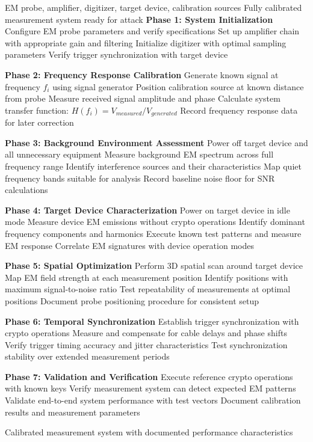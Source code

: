 \documentclass[11pt,a4paper]{article}
\theoremstyle{definition}
\begin{document}
\begin{algorithm}
\caption{Comprehensive EM Measurement Calibration}
\begin{algorithmic}[1]
\REQUIRE EM probe, amplifier, digitizer, target device, calibration sources
\ENSURE Fully calibrated measurement system ready for attack
\STATE \textbf{Phase 1: System Initialization}
\STATE Configure EM probe parameters and verify specifications
\STATE Set up amplifier chain with appropriate gain and filtering
\STATE Initialize digitizer with optimal sampling parameters
\STATE Verify trigger synchronization with target device

\STATE \textbf{Phase 2: Frequency Response Calibration}
    \STATE Generate known signal at frequency $f_i$ using signal generator
    \STATE Position calibration source at known distance from probe
    \STATE Measure received signal amplitude and phase
    \STATE Calculate system transfer function: $H(f_i) = V_{measured}/V_{generated}$
    \STATE Record frequency response data for later correction
\ENDFOR

\STATE \textbf{Phase 3: Background Environment Assessment}
\STATE Power off target device and all unnecessary equipment
\STATE Measure background EM spectrum across full frequency range
\STATE Identify interference sources and their characteristics
\STATE Map quiet frequency bands suitable for analysis
\STATE Record baseline noise floor for SNR calculations

\STATE \textbf{Phase 4: Target Device Characterization}
\STATE Power on target device in idle mode
\STATE Measure device EM emissions without crypto operations
\STATE Identify dominant frequency components and harmonics
\STATE Execute known test patterns and measure EM response
\STATE Correlate EM signatures with device operation modes

\STATE \textbf{Phase 5: Spatial Optimization}
\STATE Perform 3D spatial scan around target device
\STATE Map EM field strength at each measurement position
\STATE Identify positions with maximum signal-to-noise ratio
\STATE Test repeatability of measurements at optimal positions
\STATE Document probe positioning procedure for consistent setup

\STATE \textbf{Phase 6: Temporal Synchronization}
\STATE Establish trigger synchronization with crypto operations
\STATE Measure and compensate for cable delays and phase shifts
\STATE Verify trigger timing accuracy and jitter characteristics
\STATE Test synchronization stability over extended measurement periods

\STATE \textbf{Phase 7: Validation and Verification}
\STATE Execute reference crypto operations with known keys
\STATE Verify measurement system can detect expected EM patterns
\STATE Validate end-to-end system performance with test vectors
\STATE Document calibration results and measurement parameters

\RETURN Calibrated measurement system with documented performance characteristics
\end{algorithmic}
\end{algorithm}
\end{document}

